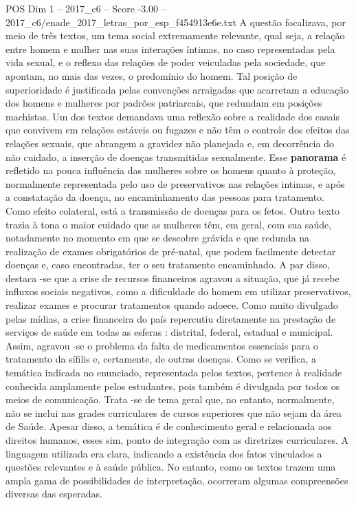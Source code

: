 \begin{textsample}{POS Dim 1 – 2017\_c6 – Score -3.00 – 2017\_c6/enade\_2017\_letras\_por\_esp\_f454913e6e.txt}
A questão focalizava, por meio de três textos, um tema social extremamente relevante, qual seja, a relação entre homem e mulher nas suas interações íntimas, no caso representadas pela vida sexual, e o reflexo das relações de poder veiculadas pela sociedade, que apontam, no mais das vezes, o predomínio do homem.
Tal posição de superioridade é justificada pelas convenções arraigadas que acarretam a educação dos homens e mulheres por padrões patriarcais, que redundam em posições machistas.
Um dos textos demandava uma reflexão sobre a realidade dos casais que convivem em relações estáveis ou fugazes e não têm o controle dos efeitos das relações sexuais, que abrangem a gravidez não planejada e, em decorrência do não cuidado, a inserção de doenças transmitidas sexualmente.
Esse \textbf{panorama} é refletido na pouca influência das mulheres sobre os homens quanto à proteção, normalmente representada pelo uso de preservativos nas relações intimas, e após a constatação da doença, no encaminhamento das pessoas para tratamento.
Como efeito colateral, está a transmissão de doenças para os fetos.
Outro texto trazia à tona o maior cuidado que as mulheres têm, em geral, com sua saúde, notadamente no momento em que se descobre grávida e que redunda na realização de exames obrigatórios de pré-natal, que podem facilmente detectar doenças e, caso encontradas, ter o seu tratamento encaminhado.
A par disso, destaca -se que a crise de recursos financeiros agravou a situação, que já recebe influxos sociais negativos, como a dificuldade do homem em utilizar preservativos, realizar exames e procurar tratamentos quando adoece.
Como muito divulgado pelas mídias, a crise financeira do país repercutiu diretamente na prestação de serviços de saúde em todas as esferas : distrital, federal, estadual e municipal.
Assim, agravou -se o problema da falta de medicamentos essenciais para o tratamento da sífilis e, certamente, de outras doenças.
Como se verifica, a temática indicada no enunciado, representada pelos textos, pertence à realidade conhecida amplamente pelos estudantes, pois também é divulgada por todos os meios de comunicação.
Trata -se de tema geral que, no entanto, normalmente, não se inclui nas grades curriculares de cursos superiores que não sejam da área de Saúde.
Apesar disso, a temática é de conhecimento geral e relacionada aos direitos humanos, esses sim, ponto de integração com as diretrizes curriculares.
A linguagem utilizada era clara, indicando a existência dos fatos vinculados a questões relevantes e à saúde pública.
No entanto, como os textos trazem uma ampla gama de possibilidades de interpretação, ocorreram algumas compreensões diversas das esperadas.

\end{textsample}
